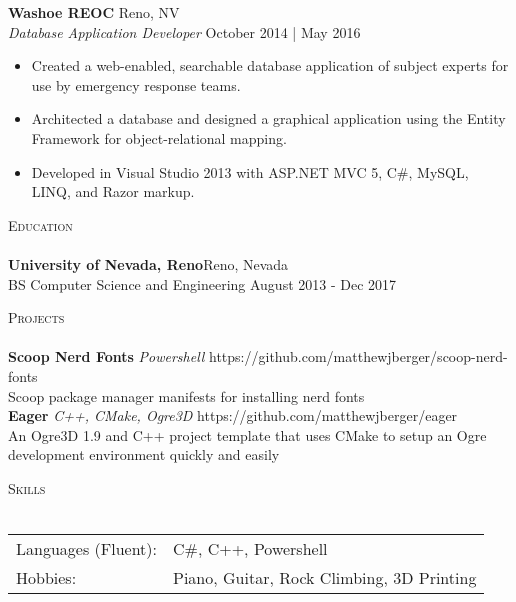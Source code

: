 \documentclass[a4paper]{article}
\newcommand{\lineunder} {
    \vspace*{-8pt} \\
    \hspace*{-18pt} \hrulefill \\
}
\newcommand{\header} [1] {
    {\hspace*{-18pt}\vspace*{6pt} \textsc{#1}}
    \vspace*{-6pt} \lineunder
}
\begin{document}
\textbf{Washoe REOC} \hfill Reno, NV\\
\textit{Database Application Developer} \hfill October 2014 | May 2016\\
\vspace{-1mm}
\begin{itemize} \itemsep 1pt
	\item Created a web-enabled, searchable database application of subject experts for use by emergency response teams.
	\item Architected a database and designed a graphical application using the Entity Framework for object-relational mapping.
	\item Developed in Visual Studio 2013 with ASP.NET MVC 5, C\#, MySQL, LINQ, and Razor markup.
\end{itemize}

\header{Education}
\textbf{University of Nevada, Reno}\hfill Reno, Nevada\\
BS Computer Science and Engineering \hfill August 2013 - Dec 2017\\
\vspace{2mm}

\header{Projects}
{\textbf{Scoop Nerd Fonts}} {\sl Powershell} \hfill https://github.com/matthewjberger/scoop-nerd-fonts\\
Scoop package manager manifests for installing nerd fonts\\
\vspace*{2mm}
{\textbf{Eager}} {\sl C++, CMake, Ogre3D} \hfill https://github.com/matthewjberger/eager\\
An Ogre3D 1.9 and C++ project template that uses CMake to setup an Ogre development environment quickly and easily\\
\vspace*{2mm}

\header{Skills}
\begin{tabular}{ l l }
	Languages (Fluent): & C\#, C++, Powershell                      \\
	Hobbies:            & Piano, Guitar, Rock Climbing, 3D Printing \\
\end{tabular}
\vspace{2mm}



\ 
\end{document}
